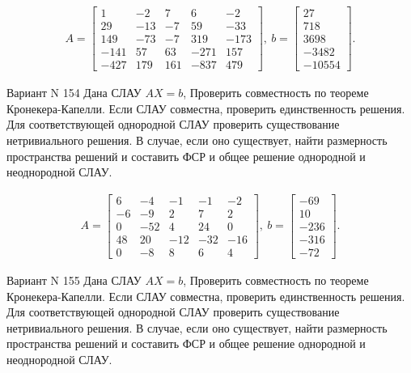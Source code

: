 \documentclass[11pt]{report}
\begin{document}
\begin{align*}
 A = \left[\begin{matrix}1 & -2 & 7 & 6 & -2\\29 & -13 & -7 & 59 & -33\\149 & -73 & -7 & 319 & -173\\-141 & 57 & 63 & -271 & 157\\-427 & 179 & 161 & -837 & 479\end{matrix}\right],
\ b = \left[\begin{matrix}27\\718\\3698\\-3482\\-10554\end{matrix}\right]. 
 \end{align*}

Вариант N 154
Дана СЛАУ $AX = b$,
Проверить совместность по теореме Кронекера-Капелли. Если СЛАУ совместна, проверить единственность решения.
Для соответствующей однородной СЛАУ проверить существование нетривиального решения. В случае, если оно существует,
найти размерность пространства решений и составить ФСР и общее решение однородной  и неоднородной СЛАУ.


\begin{align*}
 A = \left[\begin{matrix}6 & -4 & -1 & -1 & -2\\-6 & -9 & 2 & 7 & 2\\0 & -52 & 4 & 24 & 0\\48 & 20 & -12 & -32 & -16\\0 & -8 & 8 & 6 & 4\end{matrix}\right],
\ b = \left[\begin{matrix}-69\\10\\-236\\-316\\-72\end{matrix}\right]. 
 \end{align*}

Вариант N 155
Дана СЛАУ $AX = b$,
Проверить совместность по теореме Кронекера-Капелли. Если СЛАУ совместна, проверить единственность решения.
Для соответствующей однородной СЛАУ проверить существование нетривиального решения. В случае, если оно существует,
найти размерность пространства решений и составить ФСР и общее решение однородной  и неоднородной СЛАУ.
\end{document}
